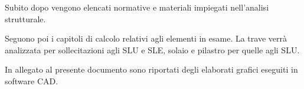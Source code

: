 Subito dopo vengono elencati normative e materiali impiegati nell'analisi strutturale.

Seguono poi i capitoli di calcolo relativi agli elementi in esame.
La trave verrà analizzata per sollecitazioni agli SLU e SLE, solaio e pilastro per quelle agli SLU.

In allegato al presente documento sono riportati degli elaborati grafici eseguiti in software CAD.